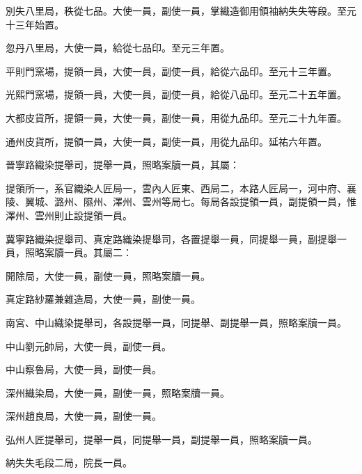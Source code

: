 \begin{pinyinscope}
 別失八里局，秩從七品。大使一員，副使一員，掌織造御用領袖納失失等段。至元十三年始置。



 忽丹八里局，大使一員，給從七品印。至元三年置。



 平則門窯場，提領一員，大使一員，副使一員，給從六品印。至元十三年置。



 光熙門窯場，提領一員，大使一員，副使一員，給從八品印。至元二十五年置。



 大都皮貨所，提領一員，大使一員，副使一員，用從九品印。至元二十九年置。



 通州皮貨所，提領一員，大使一員，副使一員，用從九品印。延祐六年置。



 晉寧路織染提舉司，提舉一員，照略案牘一員，其屬：



 提領所一，系官織染人匠局一，雲內人匠東、西局二，本路人匠局一，河中府、襄陵、翼城、潞州、隰州、澤州、雲州等局七。每局各設提領一員，副提領一員，惟澤州、雲州則止設提領一員。



 冀寧路織染提舉司、真定路織染提舉司，各置提舉一員，同提舉一員，副提舉一員，照略案牘一員。其屬二：



 開除局，大使一員，副使一員，照略案牘一員。



 真定路紗羅兼雜造局，大使一員，副使一員。



 南宮、中山織染提舉司，各設提舉一員，同提舉、副提舉一員，照略案牘一員。



 中山劉元帥局，大使一員，副使一員。



 中山察魯局，大使一員，副使一員。



 深州織染局，大使一員，副使一員，照略案牘一員。



 深州趙良局，大使一員，副使一員。



 弘州人匠提舉司，提舉一員，同提舉一員，副提舉一員，照略案牘一員。



 納失失毛段二局，院長一員。




\end{pinyinscope}
